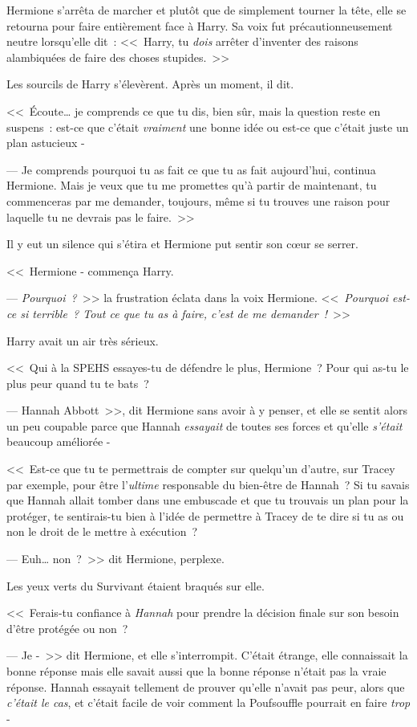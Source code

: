 Hermione s'arrêta de marcher et plutôt que de simplement tourner la tête, elle se retourna pour faire entièrement face à Harry. Sa voix fut précautionneusement neutre lorsqu'elle dit~: <<~Harry, tu \emph{dois} arrêter d'inventer des raisons alambiquées de faire des choses stupides.~>>

Les sourcils de Harry s'élevèrent. Après un moment, il dit.

<<~Écoute… je comprends ce que tu dis, bien sûr, mais la question reste en suspens~: est-ce que c'était \emph{vraiment} une bonne idée ou est-ce que c'était juste un plan astucieux -

--- Je comprends pourquoi tu as fait ce que tu as fait aujourd'hui, continua Hermione. Mais je veux que tu me promettes qu'à partir de maintenant, tu commenceras par me demander, toujours, même si tu trouves une raison pour laquelle tu ne devrais pas le faire.~>>

Il y eut un silence qui s'étira et Hermione put sentir son cœur se serrer.

<<~Hermione - commença Harry.

--- \emph{Pourquoi~?}~>> la frustration éclata dans la voix Hermione. <<~\emph{Pourquoi est-ce si terrible~? Tout ce que tu as à faire, c'est de me demander~!}~>>

Harry avait un air très sérieux.

<<~Qui à la SPEHS essayes-tu de défendre le plus, Hermione~? Pour qui as-tu le plus peur quand tu te bats~?

--- Hannah Abbott~>>, dit Hermione sans avoir à y penser, et elle se sentit alors un peu coupable parce que Hannah \emph{essayait} de toutes ses forces et qu'elle \emph{s'était} beaucoup améliorée -

<<~Est-ce que tu te permettrais de compter sur quelqu'un d'autre, sur Tracey par exemple, pour être l'\emph{ultime} responsable du bien-être de Hannah~? Si tu savais que Hannah allait tomber dans une embuscade et que tu trouvais un plan pour la protéger, te sentirais-tu bien à l'idée de permettre à Tracey de te dire si tu as ou non le droit de le mettre à exécution~?

--- Euh… non~?~>> dit Hermione, perplexe.

Les yeux verts du Survivant étaient braqués sur elle.

<<~Ferais-tu confiance à \emph{Hannah} pour prendre la décision finale sur son besoin d'être protégée ou non~?

--- Je -~>> dit Hermione, et elle s'interrompit. C'était étrange, elle connaissait la bonne réponse mais elle savait aussi que la bonne réponse n'était pas la vraie réponse. Hannah essayait tellement de prouver qu'elle n'avait pas peur, alors que \emph{c'était le cas}, et c'était facile de voir comment la Poufsouffle pourrait en faire \emph{trop} -

